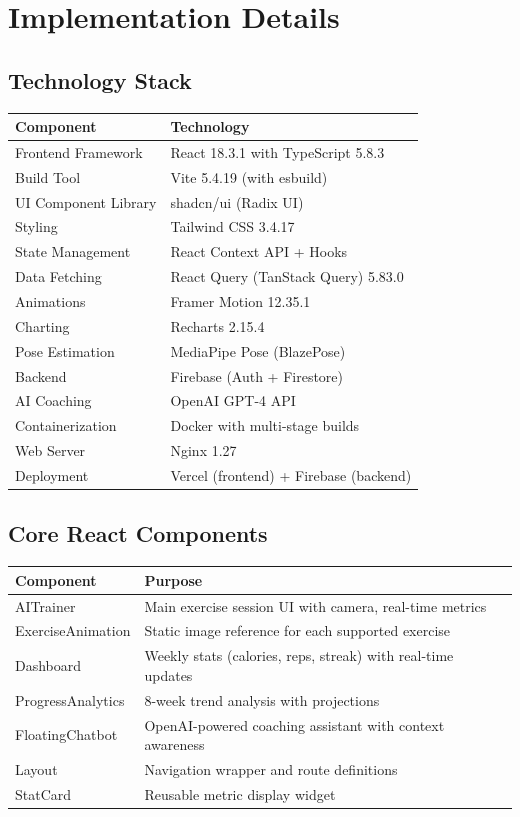 \documentclass[12pt,a4paper]{article}
\begin{document}
\section{Implementation Details}

\subsection{Technology Stack}

\begin{longtable}{p{4.5cm} p{8cm}}
\toprule
\textbf{Component} & \textbf{Technology} \\
\midrule
\endhead
Frontend Framework & React 18.3.1 with TypeScript 5.8.3 \\
Build Tool & Vite 5.4.19 (with esbuild) \\
UI Component Library & shadcn/ui (Radix UI) \\
Styling & Tailwind CSS 3.4.17 \\
State Management & React Context API + Hooks \\
Data Fetching & React Query (TanStack Query) 5.83.0 \\
Animations & Framer Motion 12.35.1 \\
Charting & Recharts 2.15.4 \\
Pose Estimation & MediaPipe Pose (BlazePose) \\
Backend & Firebase (Auth + Firestore) \\
AI Coaching & OpenAI GPT-4 API \\
Containerization & Docker with multi-stage builds \\
Web Server & Nginx 1.27 \\
Deployment & Vercel (frontend) + Firebase (backend) \\
\bottomrule
\end{longtable}

\subsection{Core React Components}

\begin{longtable}{p{4.5cm} p{8cm}}
\toprule
\textbf{Component} & \textbf{Purpose} \\
\midrule
\endhead
AITrainer & Main exercise session UI with camera, real-time metrics \\
ExerciseAnimation & Static image reference for each supported exercise \\
Dashboard & Weekly stats (calories, reps, streak) with real-time updates \\
ProgressAnalytics & 8-week trend analysis with projections \\
FloatingChatbot & OpenAI-powered coaching assistant with context awareness \\
Layout & Navigation wrapper and route definitions \\
StatCard & Reusable metric display widget \\
\bottomrule
\end{longtable}
\end{document}
